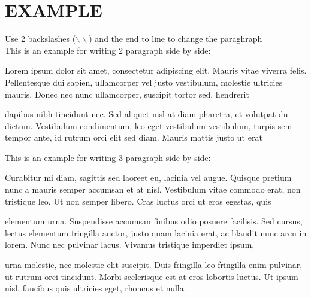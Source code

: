 \chapter*{\fontb EXAMPLE\\}


Use 2 backslashes ($\backslash\backslash$) and the end to line to change
the paraghraph\\

This is an example for writing 2 paragraph side by side\textbf{:}\\

\begin{minipage}{0.45\textwidth} %
Lorem ipsum dolor sit amet, consectetur adipiscing elit. Mauris vitae viverra
felis. Pellentesque dui sapien, ullamcorper vel justo vestibulum, molestie
ultricies mauris. Donec nec nunc ullamcorper, suscipit tortor sed, hendrerit
\end{minipage}
\hspace{0.5cm} %
\begin{minipage}{0.45\textwidth}
dapibus nibh tincidunt nec. Sed aliquet nisl at diam pharetra, et volutpat dui
dictum. Vestibulum condimentum, leo eget vestibulum vestibulum, turpis sem
tempor ante, id rutrum orci elit sed diam. Mauris mattis justo ut erat
\end{minipage}

\vspace{0.5cm} %
This is an example for writing 3 paragraph side by side\textbf{:}\\

\begin{minipage}{0.30\textwidth}
Curabitur mi diam, sagittis sed laoreet eu, lacinia vel augue. Quisque pretium
nunc a mauris semper accumsan et at nisl. Vestibulum vitae commodo erat, non
tristique leo. Ut non semper libero. Cras luctus orci ut eros egestas, quis
\end{minipage}
\hspace{0.5cm}
\begin{minipage}{0.30\textwidth}
elementum urna. Suspendisse accumsan finibus odio posuere facilisis. Sed
cursus, lectus elementum fringilla auctor, justo quam lacinia erat, ac blandit
nunc arcu in lorem. Nunc nec pulvinar lacus. Vivamus tristique imperdiet ipsum,
\end{minipage}
\hspace{0.5cm}
\begin{minipage}{0.30\textwidth}
urna molestie, nec molestie elit suscipit. Duis fringilla leo fringilla enim
pulvinar, ut rutrum orci tincidunt. Morbi scelerisque est at eros lobortis
luctus. Ut ipsum nisl, faucibus quis ultricies eget, rhoncus et nulla.
\end{minipage}\\

